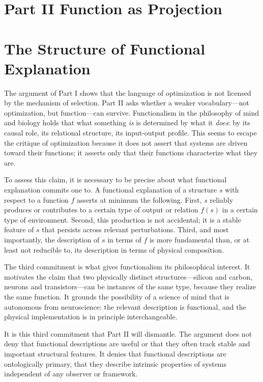 \documentclass[12pt, a4paper, oneside]{article}
\theoremstyle{plain}
\theoremstyle{definition}
\theoremstyle{remark}
\begin{document}
\section*{Part II \quad Function as Projection}

\setcounter{section}{4}

\section{The Structure of Functional Explanation}

The argument of Part I shows that the language of optimization is not licensed by the mechanism of selection. Part II asks whether a weaker vocabulary---not optimization, but function---can survive. Functionalism in the philosophy of mind and biology holds that what something \emph{is} is determined by what it \emph{does}: by its causal role, its relational structure, its input-output profile. This seems to escape the critique of optimization because it does not assert that systems are driven toward their functions; it asserts only that their functions characterize what they are.

To assess this claim, it is necessary to be precise about what functional explanation commits one to. A functional explanation of a structure $s$ with respect to a function $f$ asserts at minimum the following. First, $s$ reliably produces or contributes to a certain type of output or relation $f(s)$ in a certain type of environment. Second, this production is not accidental; it is a stable feature of $s$ that persists across relevant perturbations. Third, and most importantly, the description of $s$ in terms of $f$ is more fundamental than, or at least not reducible to, its description in terms of physical composition.

The third commitment is what gives functionalism its philosophical interest. It motivates the claim that two physically distinct structures---silicon and carbon, neurons and transistors---can be instances of the same type, because they realize the same function. It grounds the possibility of a science of mind that is autonomous from neuroscience: the relevant description is functional, and the physical implementation is in principle interchangeable.

It is this third commitment that Part II will dismantle. The argument does not deny that functional descriptions are useful or that they often track stable and important structural features. It denies that functional descriptions are ontologically primary, that they describe intrinsic properties of systems independent of any observer or framework.
\end{document}
